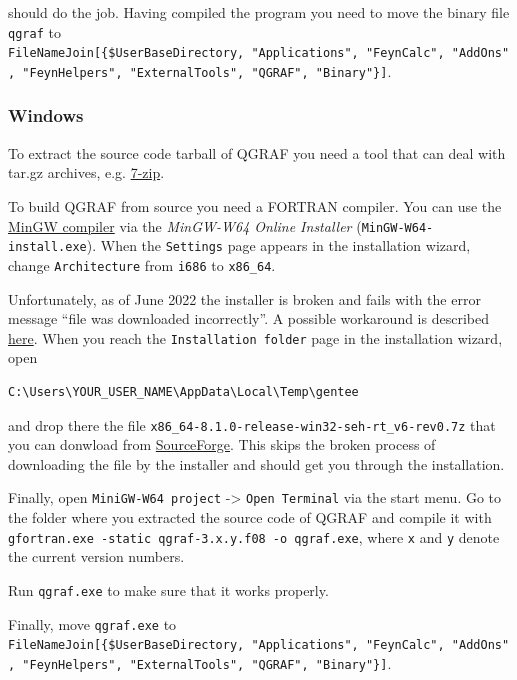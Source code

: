 \documentclass[../FeynHelpersManual.tex]{subfiles}
\begin{document}
should do the job. Having compiled the program you need to move the
binary file \texttt{qgraf} to
\texttt{FileNameJoin[\allowbreak{}\{\allowbreak{}\$UserBaseDirectory,\ \allowbreak{}"Applications",\ \allowbreak{}"FeynCalc",\ \allowbreak{}"AddOns",\ \allowbreak{}"FeynHelpers",\ \allowbreak{}"ExternalTools",\ \allowbreak{}"QGRAF",\ \allowbreak{}"Binary"\}]}.

\subsubsection{Windows}\label{windows-5}

To extract the source code tarball of QGRAF you need a tool that can
deal with tar.gz archives, e.g. \href{https://www.7-zip.org/}{7-zip}.

To build QGRAF from source you need a FORTRAN compiler. You can use the
\href{https://sourceforge.net/projects/mingw-w64/files/mingw-w64}{MinGW
compiler} via the \emph{MinGW-W64 Online Installer}
(\texttt{MinGW-W64-install.exe}). When the \texttt{Settings} page
appears in the installation wizard, change \texttt{Architecture} from
\texttt{i686} to \texttt{x86_64}.

Unfortunately, as of June 2022 the installer is broken and fails with
the error message ``file was downloaded incorrectly''. A possible
workaround is described
\href{https://sourceforge.net/p/mingw-w64/support-requests/125/}{here}.
When you reach the \texttt{Installation folder} page in the installation
wizard, open

\begin{verbatim}
C:\Users\YOUR_USER_NAME\AppData\Local\Temp\gentee
\end{verbatim}

and drop there the file
\texttt{x86_64-8.1.0-release-win32-seh-rt_v6-rev0.7z} that you can
donwload from
\href{https://sourceforge.net/projects/mingw-w64/files/Toolchains\%20targetting\%20Win64/Personal\%20Builds/mingw-builds/8.1.0/threads-posix/seh/x86_64-8.1.0-release-posix-seh-rt_v6-rev0.7z}{SourceForge}.
This skips the broken process of downloading the file by the installer
and should get you through the installation.

Finally, open \texttt{MiniGW-W64 project} -\textgreater{}
\texttt{Open Terminal} via the start menu. Go to the folder where you
extracted the source code of QGRAF and compile it with
\texttt{gfortran.exe -static qgraf-3.x.y.f08 -o qgraf.exe}, where
\texttt{x} and \texttt{y} denote the current version numbers.

Run \texttt{qgraf.exe} to make sure that it works properly.

Finally, move \texttt{qgraf.exe} to
\texttt{FileNameJoin[\allowbreak{}\{\allowbreak{}\$UserBaseDirectory,\ \allowbreak{}"Applications",\ \allowbreak{}"FeynCalc",\ \allowbreak{}"AddOns",\ \allowbreak{}"FeynHelpers",\ \allowbreak{}"ExternalTools",\ \allowbreak{}"QGRAF",\ \allowbreak{}"Binary"\}]}.
\end{document}
